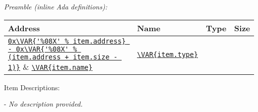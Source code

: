 
\\
\\
\textit{Preamble (inline Ada definitions):}
\begin{adacode}
\end{adacode}

\begin{xltabular}{\textwidth}{ | X | X | X | c | }
  \hline
  \textbf{Address} & \textbf{Name} & \textbf{Type} & \textbf{Size} \\ \hline
  \texttt{\url{0x\VAR{'%
  \texttt{\url{\VAR{item.name}}} &
  \texttt{\url{\VAR{item.type}}} &
  \texttt{} \\ \hline
\end{xltabular}
\vspace{5mm} %

Item Descriptions:
\begin{spaceditemize}
  \item \textbf{\texttt{}} - 
    \textit{No description provided.}
\end{spaceditemize}
\vspace{5mm} %
